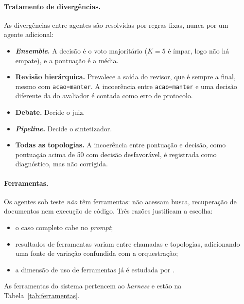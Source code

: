 \documentclass[12pt]{article}
\begin{document}
\paragraph{Tratamento de divergências.} As divergências entre agentes são resolvidas por regras fixas, nunca por um agente adicional:
\begin{itemize}
    \item \textbf{\textit{Ensemble}.} A decisão é o voto majoritário ($K=5$ é ímpar, logo não há empate), e a pontuação é a média.
    \item \textbf{Revisão hierárquica.} Prevalece a saída do revisor, que é sempre a final, mesmo com \texttt{acao=manter}. A incoerência entre \texttt{acao=manter} e uma decisão diferente da do avaliador é contada como erro de protocolo.
    \item \textbf{Debate.} Decide o juiz.
    \item \textbf{\textit{Pipeline}.} Decide o sintetizador.
    \item \textbf{Todas as topologias.} A incoerência entre pontuação e decisão, como pontuação acima de 50 com decisão desfavorável, é registrada como diagnóstico, mas não corrigida.
\end{itemize}

\paragraph{Ferramentas.} Os agentes sob teste \emph{não} têm ferramentas: não acessam busca, recuperação de documentos nem execução de código. Três razões justificam a escolha:
\begin{itemize}
    \item o caso completo cabe no \textit{prompt};
    \item resultados de ferramentas variam entre chamadas e topologias, adicionando uma fonte de variação confundida com a orquestração;
    \item a dimensão de uso de ferramentas já é estudada por \citet{morla2026agentfairbench}.
\end{itemize}
As ferramentas do sistema pertencem ao \textit{harness} e estão na Tabela~\ref{tab:ferramentas}.
\end{document}
